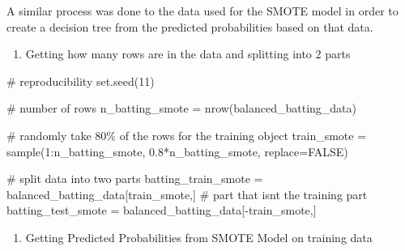 \documentclass[
  letterpaper,
  DIV=11,
  numbers=noendperiod]{scrartcl}
\newenvironment{Shaded}{\begin{snugshade}}{\end{snugshade}}
\newcommand{\AttributeTok}[1]{\textcolor[rgb]{0.40,0.45,0.13}{#1}}
\newcommand{\CommentTok}[1]{\textcolor[rgb]{0.37,0.37,0.37}{#1}}
\newcommand{\ConstantTok}[1]{\textcolor[rgb]{0.56,0.35,0.01}{#1}}
\newcommand{\DecValTok}[1]{\textcolor[rgb]{0.68,0.00,0.00}{#1}}
\newcommand{\FloatTok}[1]{\textcolor[rgb]{0.68,0.00,0.00}{#1}}
\newcommand{\FunctionTok}[1]{\textcolor[rgb]{0.28,0.35,0.67}{#1}}
\newcommand{\NormalTok}[1]{\textcolor[rgb]{0.00,0.23,0.31}{#1}}
\newcommand{\OtherTok}[1]{\textcolor[rgb]{0.00,0.23,0.31}{#1}}
\newcommand{\SpecialCharTok}[1]{\textcolor[rgb]{0.37,0.37,0.37}{#1}}
\providecommand{\tightlist}{%
  \setlength{\itemsep}{0pt}\setlength{\parskip}{0pt}}\usepackage{longtable,booktabs,array}
\begin{document}
A similar process was done to the data used for the SMOTE model in order
to create a decision tree from the predicted probabilities based on that
data.

\begin{enumerate}
\def\labelenumi{\arabic{enumi}.}
\tightlist
\item
  Getting how many rows are in the data and splitting into 2 parts
\end{enumerate}

\begin{Shaded}
\begin{Highlighting}[]
\CommentTok{\# reproducibility }
\FunctionTok{set.seed}\NormalTok{(}\DecValTok{11}\NormalTok{)}

\CommentTok{\# number of rows }
\NormalTok{n\_batting\_smote }\OtherTok{=} \FunctionTok{nrow}\NormalTok{(balanced\_batting\_data)}

\CommentTok{\# randomly take 80\% of the rows for the training object }
\NormalTok{train\_smote }\OtherTok{=} \FunctionTok{sample}\NormalTok{(}\DecValTok{1}\SpecialCharTok{:}\NormalTok{n\_batting\_smote,}
                     \FloatTok{0.8}\SpecialCharTok{*}\NormalTok{n\_batting\_smote,}
                     \AttributeTok{replace=}\ConstantTok{FALSE}\NormalTok{)}
\end{Highlighting}
\end{Shaded}

\begin{Shaded}
\begin{Highlighting}[]
\CommentTok{\# split data into two parts}
\NormalTok{batting\_train\_smote }\OtherTok{=}\NormalTok{ balanced\_batting\_data[train\_smote,]}
\CommentTok{\# part that isn\textquotesingle{}t the training part}
\NormalTok{batting\_test\_smote }\OtherTok{=}\NormalTok{ balanced\_batting\_data[}\SpecialCharTok{{-}}\NormalTok{train\_smote,]}
\end{Highlighting}
\end{Shaded}

\begin{enumerate}
\def\labelenumi{\arabic{enumi}.}
\setcounter{enumi}{1}
\tightlist
\item
  Getting Predicted Probabilities from SMOTE Model on training data
\end{enumerate}
\end{document}
